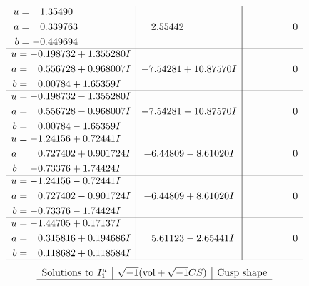 \documentclass[1p]{elsarticle_modified}
\theoremstyle{definition}
\newcommand{\I}{\sqrt{-1}}
\begin{document}
$$\begin{array}{c|c|c}
\begin{aligned}
u &= \phantom{-}1.35490\phantom{ +0.000000I} \\
a &= \phantom{-}0.339763\phantom{ +0.000000I} \\
b &= -0.449694\phantom{ +0.000000I}\end{aligned}
 & \phantom{-}2.55442\phantom{ +0.000000I} & \phantom{-0.000000 } 0 \\ \hline\begin{aligned}
u &= -0.198732 + 1.355280 I \\
a &= \phantom{-}0.556728 + 0.968007 I \\
b &= \phantom{-}0.00784 + 1.65359 I\end{aligned}
 & -7.54281 + 10.87570 I & \phantom{-0.000000 } 0 \\ \hline\begin{aligned}
u &= -0.198732 - 1.355280 I \\
a &= \phantom{-}0.556728 - 0.968007 I \\
b &= \phantom{-}0.00784 - 1.65359 I\end{aligned}
 & -7.54281 - 10.87570 I & \phantom{-0.000000 } 0 \\ \hline\begin{aligned}
u &= -1.24156 + 0.72441 I \\
a &= \phantom{-}0.727402 + 0.901724 I \\
b &= -0.73376 + 1.74424 I\end{aligned}
 & -6.44809 - 8.61020 I & \phantom{-0.000000 } 0 \\ \hline\begin{aligned}
u &= -1.24156 - 0.72441 I \\
a &= \phantom{-}0.727402 - 0.901724 I \\
b &= -0.73376 - 1.74424 I\end{aligned}
 & -6.44809 + 8.61020 I & \phantom{-0.000000 } 0 \\ \hline\begin{aligned}
u &= -1.44705 + 0.17137 I \\
a &= \phantom{-}0.315816 + 0.194686 I \\
b &= \phantom{-}0.118682 + 0.118584 I\end{aligned}
 & \phantom{-}5.61123 - 2.65441 I & \phantom{-0.000000 } 0\\
 \hline 
 \end{array}$$\newpage$$\begin{array}{c|c|c}  
\text{Solutions to }I^u_{1}& \I (\text{vol} + \sqrt{-1}CS) & \text{Cusp shape}\\
 \hline 

\end{array}$$
\end{document}
